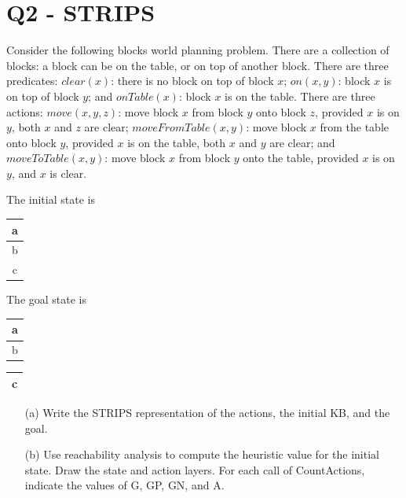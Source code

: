 \documentclass[a4paper, 11pt]{article}
\begin{document}
\newpage
\section{Q2 - STRIPS}
\begin{question}\normalfont
Consider the following blocks world planning problem.
There are a collection of blocks: a block can be on the table, or on top of another block.
There are three predicates:
$clear(x)$: there is no block on top of block $x$;
$on(x, y)$: block $x$ is on top of block $y$; and
$onTable(x)$: block $x$ is on the table.
There are three actions:
$move(x, y, z)$: move block $x$ from block $y$ onto block $z$, provided $x$ is on $y$, both $x$ and $z$ are clear;
$moveFromTable(x, y)$: move block $x$ from the table onto block $y$, provided $x$ is on the table, both $x$ and $y$ are clear; and
$moveToTable(x, y)$: move block $x$ from block $y$ onto the table, provided $x$ is on $y$, and $x$ is clear.

The initial state is
\begin{tabular}{|c|}\hline
a\\\hline b\\\hline c\\\hline
\end{tabular}
\qquad The goal state is
\begin{tabular}{|c|}\hline
a\\\hline b\\\hline
\end{tabular}
\quad
\begin{tabular}{|c|}\hline
c\\\hline
\end{tabular}
\begin{itemize}
    \item [(a)] Write the STRIPS representation of the actions, the initial KB, and the goal.
    \item [(b)] Use reachability analysis to compute the heuristic value for the initial state. Draw the state and action layers. For each call of CountActions, indicate the values of G, GP, GN, and A.
\end{itemize}
\end{question}
\end{document}
